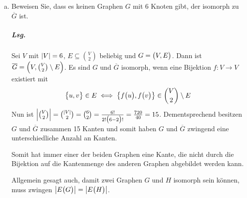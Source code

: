 \documentclass{scrreprt}
\begin{document}
\begin{enumerate}[(a)]
\newpage
\item Beweisen Sie, dass es keinen Graphen $G$ mit 6 Knoten gibt, der isomorph zu
  $\overline{G}$ ist.

  \subparagraph{Lsg.} Sei $V$ mit $\abs{V} = 6$,
  $E \subseteq \binom{V}{2}$ beliebig und $G = \qty\big(V, E)$.
  Dann ist $\overline{G} = \qty(V, \binom{V}{2} \setminus E)$.
  Es sind $G$ und $\overline{G}$ isomorph, wenn eine Bijektion
  $f \colon V \to V$ existiert mit
  \[
    \qty\big{u, v} \in E
    \iff \qty{f\qty\big(u), f\qty\big(v)} \in \binom{V}{2} \setminus E
  \]
  Nun ist $\abs{\binom{V}{2}} = \binom{\abs{V}}{2} = \binom{6}{2}
  = \frac{6!}{2!\qty\big(6 - 2)!} = \frac{720}{40} = 15$.
  Dementsprechend besitzen $G$ und $\overline{G}$ zusammen 15 Kanten und somit
  haben $G$ und $\overline{G}$ zwingend eine unterschiedliche Anzahl an Kanten.

  Somit hat immer einer der beiden Graphen eine Kante, die nicht durch die
  Bijektion auf die Kantenmenge des anderen Graphen abgebildet werden kann.

  Allgemein gesagt auch, damit zwei Graphen $G$ und $H$ isomorph sein können,
  muss zwingen $\abs{E\qty\big(G)} = \abs{E\qty\big(H)}$.
\end{enumerate}
\end{document}
